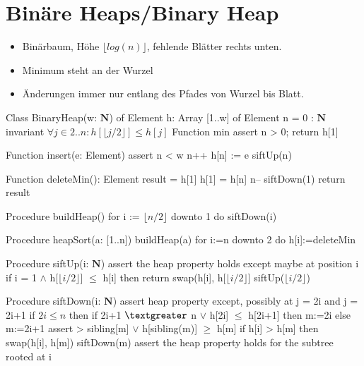 \section{Binäre Heaps/Binary Heap}
\begin{itemize}
    \item Binärbaum, Höhe $\lfloor log(n) \rfloor$, fehlende Blätter rechts unten.
    \item Minimum steht an der Wurzel
    \item Änderungen immer nur entlang des Pfades von Wurzel bis Blatt.
\end{itemize}

\begin{PseudoCode}
Class BinaryHeap(w: $\mathbf{N}$) of Element
    h: Array [1..w] of Element
    n = 0 : $\mathbf{N}$
    invariant $\forall j \in 2..n: h[\lfloor j/2 \rfloor] \leq h[j]$
    Function min assert n > 0; return h[1]
\end{PseudoCode}

\begin{PseudoCode}[caption=Einfügen in O(log $n$)]
Function insert(e: Element)
    assert n < w
    n++
    h[n] := e
    siftUp(n)
\end{PseudoCode}

\begin{PseudoCode}[caption=Kleinstes Element entfernen in O($\log n$)]
Function deleteMin(): Element
    result = h[1]
    h[1] = h[n]
    n--
    siftDown(1)
    return result
\end{PseudoCode}

\begin{PseudoCode}[caption=Heap bauen in O($n$)]
Procedure buildHeap()
    for i := $\lfloor n/2 \rfloor$ downto 1 do
        siftDown(i)
\end{PseudoCode}

\begin{PseudoCode}[caption=Heapsort in O($n$ $\cdot \log n$)]
Procedure heapSort(a: [1..n])
    buildHeap(a)
    for i:=n downto 2 do
        h[i]:=deleteMin
\end{PseudoCode}

\begin{PseudoCode}[caption=siftUp Invarianten wiederherstellen in O($\log n$)]
Procedure siftUp(i: $\mathbf{N}$)
    assert the heap property holds except maybe at position i
    if i = 1 $\wedge$ h[$\lfloor i/2 \rfloor$] $\leq$ h[i] then return
    swap(h[i], h[$\lfloor i/2 \rfloor$]
    siftUp($\lfloor i/2 \rfloor$)
\end{PseudoCode}
\newpage
\begin{PseudoCode}[caption=siftDown Invarianten wiederherstellen in O($\log n$)]
Procedure siftDown(i: $\mathbf{N}$)
    assert heap property except, possibly at j = 2i and j = 2i+1
    if $2i \leq n$ then
        if 2i+1 $\textgreater$ n $\vee$ h[2i] $\leq$ h[2i+1] then m:=2i else m:=2i+1
        assert > sibling[m] $\vee$ h[sibling(m)] $\geq$ h[m]
        if h[i] > h[m] then
            swap(h[i], h[m])
            siftDown(m)
    assert the heap property holds for the subtree rooted at i
\end{PseudoCode}